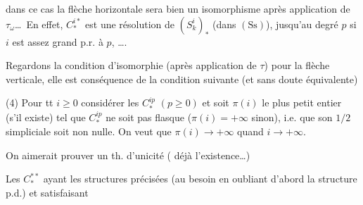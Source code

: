 dans ce cas la flèche horizontale sera bien un isomorphisme  après application de $\tau_\omega$\ldots\ En effet,  $C_*^{i*}$ est une résolution de $(S_k^i)_*$ (dans $(\mathrm{Ss})$), jusqu'au degré $p$ si $i$ est assez grand p.r. à $p$, \ldots.

 Regardons la condition d'isomorphie (après application de $\tau$) pour la flèche verticale, elle  est conséquence de la condition suivante (et sans doute équivalente)

(4) Pour tt $i\geq0$ considérer les  $C_*^{ip}$ $(p\geq0)$ et soit $\pi(i)$ le plus petit entier (s'il existe) tel que $C_*^{ip}$ ne soit pas flasque ($\pi(i)=+\infty$ sinon),  i.e. que son \uline{} $1/2$ simpliciale  soit non nulle. On veut que $\pi(i)\longrightarrow+\infty$ quand $i\longrightarrow+\infty$.


On aimerait prouver un th. d'unicité ( déjà l'existence\ldots)

Les $C_*^{**}$ ayant les structures précisées (au besoin en oubliant d'abord la structure p.d.) et satisfaisant
